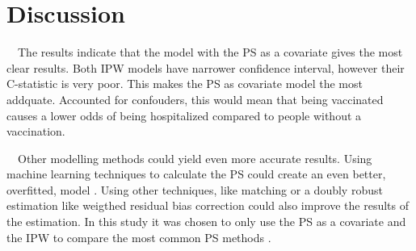 \documentclass[
]{article}
\begin{document}
\hypertarget{discussion}{%
\section{Discussion}\label{discussion}}

~~The results indicate that the model with the PS as a covariate gives the most clear results. Both IPW models have narrower confidence interval, however their C-statistic is very poor. This makes the PS as covariate model the most addquate. Accounted for confouders, this would mean that being vaccinated causes a lower odds of being hospitalized compared to people without a vaccination.

~~Other modelling methods could yield even more accurate results. Using machine learning techniques to calculate the PS could create an even better, overfitted, model \citep{schafer}. Using other techniques, like matching or a doubly robust estimation like weigthed residual bias correction could also improve the results of the estimation. In this study it was chosen to only use the PS as a covariate and the IPW to compare the most common PS methods \citep{schafer}.

  
\end{document}
